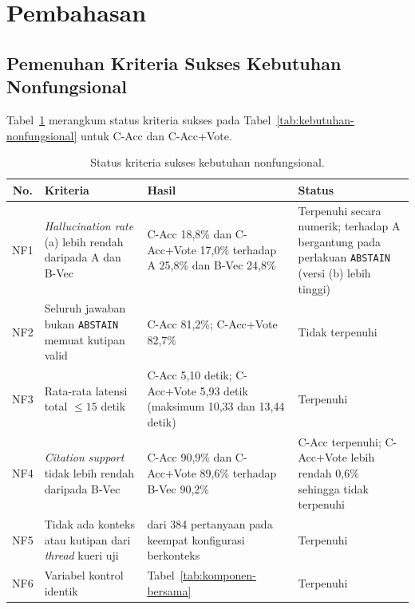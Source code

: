 \section{Pembahasan}
\label{sec:pembahasan}

\subsection{Pemenuhan Kriteria Sukses Kebutuhan Nonfungsional}
\label{subsec:pembahasan-nonfungsional}

Tabel~\ref{tab:status-nf} merangkum status kriteria sukses pada Tabel~\ref{tab:kebutuhan-nonfungsional} untuk C-Acc dan C-Acc+Vote.

\begin{table}[!htbp]
\centering
\small
\caption{Status kriteria sukses kebutuhan nonfungsional.}
\label{tab:status-nf}
\renewcommand{\arraystretch}{1.2}
\begin{tabularx}{\textwidth}{|c|>{\raggedright\arraybackslash}p{2.6cm}|>{\raggedright\arraybackslash}X|>{\raggedright\arraybackslash}p{3.0cm}|}
\hline
\textbf{No.} & \textbf{Kriteria} & \textbf{Hasil} & \textbf{Status} \\
\hline
NF1 & \emph{Hallucination rate} (a) lebih rendah daripada A dan B-Vec & C-Acc 18,8\% dan C-Acc+Vote 17,0\% terhadap A 25,8\% dan B-Vec 24,8\% & Terpenuhi secara numerik; terhadap A bergantung pada perlakuan \texttt{ABSTAIN} (versi (b) lebih tinggi) \\
\hline
NF2 & Seluruh jawaban bukan \texttt{ABSTAIN} memuat kutipan valid & C-Acc 81,2\%; C-Acc+Vote 82,7\% & Tidak terpenuhi \\
\hline
NF3 & Rata-rata latensi total $\leq 15$ detik & C-Acc 5,10 detik; C-Acc+Vote 5,93 detik (maksimum 10,33 dan 13,44 detik) & Terpenuhi \\
\hline
NF4 & \emph{Citation support} tidak lebih rendah daripada B-Vec & C-Acc 90,9\% dan C-Acc+Vote 89,6\% terhadap B-Vec 90,2\% & C-Acc terpenuhi; C-Acc+Vote lebih rendah 0,6\% sehingga tidak terpenuhi \\
\hline
NF5 & Tidak ada konteks atau kutipan dari \emph{thread} kueri uji & 0 dari 384 pertanyaan pada keempat konfigurasi berkonteks & Terpenuhi \\
\hline
NF6 & Variabel kontrol identik & Tabel~\ref{tab:komponen-bersama} & Terpenuhi \\
\hline
\end{tabularx}
\end{table}

